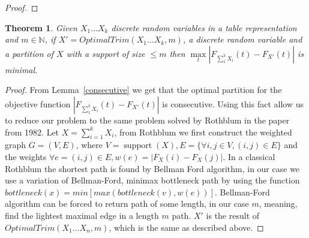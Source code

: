 \documentclass[review]{elsarticle}
\newtheorem{theorem}[lemma]{Theorem}
\DeclareMathOperator{\support}{support}
\begin{document}
\begin{proof}
\end{proof}


\begin{theorem}
Given $X_1 \dots X_k$ discrete random variables in a table representation and $m \in \mathbb{N}$, if $X'=OptimalTrim(X_1 \dots X_k,m)$, a discrete random variable and a partition of $X$ with a support of size $\leq m$ then $\max\limits_{t}|F_{\sum_1^k X_i}(t)-F_{X'}(t)|$ is minimal.
\end{theorem}

\begin{proof}
From Lemma~\ref{consecutive} we get that the optimal partition for the objective function $|F_{\sum_1^k X_i}(t)-F_{X'}(t)|$ is consecutive.
Using this fact allow us to reduce our problem to the same problem solved by Rothblum in the paper from 1982. Let $X = \sum_{i=1}^k X_i$, from Rothblum we first construct the weighted graph $G = (V,E)$, where $V = \support(X), E = \{\forall i,j \in V, (i,j)\in E\}$ and the weights $\forall e=(i,j)\in E, w(e) = |F_{X}(i)-F_{X}(j)|$. In a classical Rothblum the shortest path is found by Bellman Ford algorithm, in our case we use a variation of Bellman-Ford, minimax bottleneck path by using the function $bottleneck(x) =    min   [max(bottleneck(v),w(e))]$. Bellman-Ford algorithm can be forced to return path of some length, in our case $m$, meaning, find the lightest maximal edge in a length $m$ path. 
$X'$ is the result of $OptimalTrim(X_1 \dots X_n,m)$, which is the same as described above. 
\end{proof}
\end{document}
